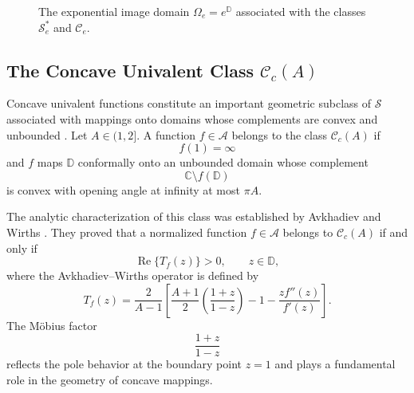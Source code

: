 \documentclass[12pt]{article}
\renewcommand{\Re}{\operatorname{Re}}
\begin{document}
\begin{figure}[h!]
\centering
{}
\caption{The exponential image domain $\Omega_e = e^{\mathbb{D}}$ associated with the classes $\mathcal{S}_e^*$ and $\mathcal{C}_e$.}
\label{fig:exponential_domain}
\end{figure}

\subsection{The Concave Univalent Class $\mathcal{C}_c(A)$}

Concave univalent functions constitute an important geometric subclass of $\mathcal{S}$ associated with mappings onto domains whose complements are convex and unbounded \cite{pm3, pm4, pm6}. Let $A\in(1,2]$. A function $f\in\mathcal{A}$ belongs to the class $\mathcal{C}_c(A)$ if
\[
f(1)=\infty
\]
and $f$ maps $\mathbb{D}$ conformally onto an unbounded domain whose complement
\[
\mathbb{C}\setminus f(\mathbb{D})
\]
is convex with opening angle at infinity at most $\pi A$.

The analytic characterization of this class was established by Avkhadiev and Wirths \cite{pm6}. They proved that a normalized function $f\in\mathcal{A}$ belongs to $\mathcal{C}_c(A)$ if and only if
\[
\Re\{T_f(z)\}>0,
\qquad z\in\mathbb{D},
\]
where the Avkhadiev--Wirths operator is defined by
\begin{equation}\label{pm1}
T_f(z)
=
\frac{2}{A-1}
\left[
\frac{A+1}{2}
\left(
\frac{1+z}{1-z}
\right)
-
1
-
\frac{zf''(z)}{f'(z)}
\right].
\end{equation}
The M\"obius factor
\[
\frac{1+z}{1-z}
\]
reflects the pole behavior at the boundary point $z=1$ and plays a fundamental role in the geometry of concave mappings.
\end{document}
